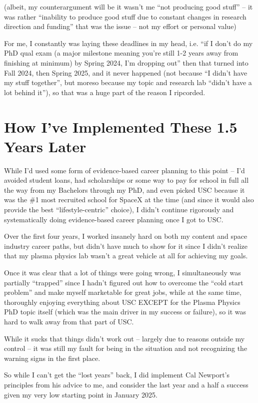\documentclass[11pt]{article}
\begin{document}
(albeit, my counterargument will be it wasn't me ``not producing good stuff'' -- it was rather ``inability to produce good stuff due to constant changes in research direction and funding'' that was the issue -- not my effort or personal value)

For me, I constantly was laying these deadlines in my head, i.e. ``if I don't do my PhD qual exam (a major milestone meaning you're still 1-2 years away from finishing at minimum) by Spring 2024, I'm dropping out'' then that turned into Fall 2024, then Spring 2025, and it never happened (not because ``I didn't have my stuff together'', but moreso because my topic and research lab ``didn't have a lot behind it''), so that was a huge part of the reason I ripcorded.

\section*{How I've Implemented These 1.5 Years Later}

While I'd used some form of evidence-based career planning to this point -- I'd avoided student loans, had scholarships or some way to pay for school in full all the way from my Bachelors through my PhD, and even picked USC because it was the \#1 most recruited school for SpaceX at the time (and since it would also provide the best ``lifestyle-centric'' choice), I didn't continue rigorously and systematically doing evidence-based career planning once I got to USC.

Over the first four years, I worked insanely hard on both my content and space industry career paths, but didn't have much to show for it since I didn't realize that my plasma physics lab wasn't a great vehicle at all for achieving my goals.

Once it was clear that a lot of things were going wrong, I simultaneously was partially ``trapped'' since I hadn't figured out how to overcome the ``cold start problem'' and make myself marketable for great jobs, while at the same time, thoroughly enjoying everything about USC EXCEPT for the Plasma Physics PhD topic itself (which was the main driver in my success or failure), so it was hard to walk away from that part of USC.

While it sucks that things didn't work out -- largely due to reasons outside my control -- it was still my fault for being in the situation and not recognizing the warning signs in the first place.

So while I can't get the ``lost years'' back, I did implement Cal Newport's principles from his advice to me, and consider the last year and a half a success given my very low starting point in January 2025.
\end{document}

